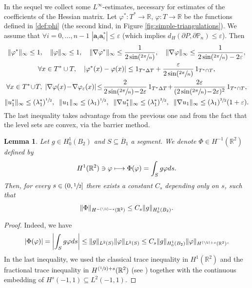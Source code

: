 \documentclass[11pt]{article}
\numberwithin{equation}{section}\newtheorem*{jepEnonce}{\jepEnonceTitle}\newenvironment{enonce*}[1]{\def\jepEnonceTitle{#1}\jepEnonce}{\endjepEnonce}\newtheorem*{conj*}{Conjecture}
\let\ra\to
\def\mto{\mathchoice{\longmapsto}{\mapsto}{\mapsto}{\mapsto}}
\newcommand{\Psfrac}[2]{(\sfrac{#1}{#2})}
\theoremstyle{plain}
\newtheorem{lemma}[thm]{Lemma}
\theoremstyle{definition}
\newcommand{\bo}[1]{{\boldsymbol#1}}
\let\Bbb\mathbb
\def\R{\mathbb{R}}
\newcommand{\vps}{\varepsilon}
\newcommand{\vphi}{\varphi}
\newcommand{\lb}{\lambda}
\newcommand{\sq}{\subseteq}
\newcommand{\ov}{\overline}
\let\jepOriginalSfrac\sfrac
\renewcommand{\sfrac}[2]{{\jepOriginalSfrac{#1}{#2}}}
\begin{document}
In the sequel we collect some $L^\infty$-estimates, necessary for estimates of the coefficients of the Hessian matrix.
Let $\vphi^*: T^*\ra \R$, $ \vphi: T \ra \R$ be the functions defined in \eqref{def:phi} (the second kind, in Figure \ref{fig:simple-triangulations}). We assume that $\forall i=0, \dots, n-1$ $|\bo a_i\bo a_i^*|\le \vps$ (which implies $d_H(\partial P, \partial \Bbb P_n) \le \vps$). Then
\begin{gather*}
\|\vphi^*\|_\infty \le 1,\quad \|\vphi\|_\infty \le 1,\quad \|\nabla \vphi^*\|_\infty \le \frac{1}{2 \sin \Psfrac{ {2}\pi}{n}},\quad \|\nabla \vphi\|_\infty \le \frac{1}{2\sin \Psfrac{ {2}\pi}{n}-2\vps},
\\
\forall x\in T^*\cup T,\quad |\vphi^*(x)-\vphi (x)|\le 1_{T^*\Delta T} + \frac{\vps}{2 \sin \Psfrac{ {2}\pi}{n}}\, 1_{T^*\cap T},
\\
\forall x\in T^*\!\cup\! T,\; |\nabla \vphi(x)\!-\!\nabla \vphi_\vps (x)|\!\le\! \frac{2}{2\sin \Psfrac{ {2}\pi}{n}\!-\!2\vps}\,1_{T^*\Delta T} \!+\! \frac{2\vps}{(2 \sin \Psfrac{ {2}\pi}{n}\!-\!2\vps)^2}\,1_{T^*\cap T },
\\
\|u_1^*\|_\infty \le(\lb_1^*)^{\sfrac 12}, \;\; \|u_1 \|_\infty \le (\lb_1)^{\sfrac 12},
\;\;
\|\nabla u_1^*\|_\infty \le (\lb_1^*)^{\sfrac 32}, \;\; \|\nabla u_1 \|_\infty \le (\lb_1)^{\sfrac 32} (1+\vps).
\end{gather*}
The last inequality takes advantage from the previous one and from the fact that the level sets are convex, via the barrier method.

\begin{lemma}\label{bobu26}
Let $g \in H^1_0(B_2)$ and $S \sq \ov B_1$ a segment. We denote $\Phi \in H^{-1} (\R^2)$ defined by\enlargethispage{-2\baselineskip}
\[
H^1(\R^2) \ni \vphi \mto \Phi (\vphi) = \int_S g \vphi ds.
\]
Then, for every $s \in (0, \sfrac 12]$ there exists a constant $C_s$ depending only on $s$, such that
\[
\|\Phi\|_{H^{-\Psfrac 12-s}(\R^2)} \le C_s \|g\|_{H^1_0(B_2)}.
\]
\end{lemma}
\begin{proof}
Indeed, we have
\[
|\Phi (\vphi)| = \left|\int_S g \vphi ds\right|\le \|g\|_{L^2(S)} \|\vphi\|_{L^2(S)}
\le C_s \|g\|_{H^1_0(B_2)} \|\vphi \|_{H^{ \Psfrac 12+s}(\R^2)}.
\]
In the last inequality, we used the classical trace inequality in $H^1(\R^2)$ and the fractional trace inequality in $H^{ \Psfrac 12+s}(\R^2)$ (see \cite[Lem.\,16.1]{Ta07}) together with the continuous embedding of $H^s(-1,1) \sq L^2(-1,1)$.
\end{proof}
\end{document}
